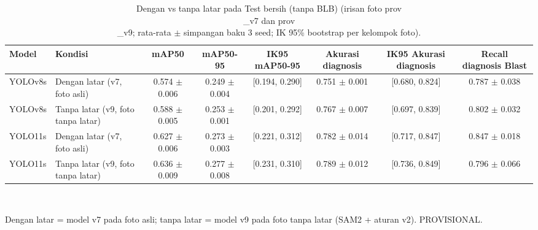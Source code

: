 \begin{table}[!t]
\centering
\caption{Dengan vs tanpa latar pada Test bersih (tanpa BLB) (irisan foto prov\\_v7 dan prov\\_v9; rata-rata $\pm$ simpangan baku 3 seed; IK 95\% bootstrap per kelompok foto).}
\label{tab:v9_2x2_test}
\footnotesize
\setlength{\tabcolsep}{3pt}
\begin{tabular}{llcccccc}
\hline
\textbf{Model} & \textbf{Kondisi} & \textbf{mAP50} & \textbf{mAP50-95} & \textbf{IK95 mAP50-95} & \textbf{Akurasi diagnosis} & \textbf{IK95 Akurasi diagnosis} & \textbf{Recall diagnosis Blast} \\
\hline
YOLOv8s & Dengan latar (v7, foto asli) & 0.574 $\pm$ 0.006 & 0.249 $\pm$ 0.004 & [0.194, 0.290] & 0.751 $\pm$ 0.001 & [0.680, 0.824] & 0.787 $\pm$ 0.038 \\
YOLOv8s & Tanpa latar (v9, foto tanpa latar) & 0.588 $\pm$ 0.005 & 0.253 $\pm$ 0.001 & [0.201, 0.292] & 0.767 $\pm$ 0.007 & [0.697, 0.839] & 0.802 $\pm$ 0.032 \\
YOLO11s & Dengan latar (v7, foto asli) & 0.627 $\pm$ 0.006 & 0.273 $\pm$ 0.003 & [0.221, 0.312] & 0.782 $\pm$ 0.014 & [0.717, 0.847] & 0.847 $\pm$ 0.018 \\
YOLO11s & Tanpa latar (v9, foto tanpa latar) & 0.636 $\pm$ 0.009 & 0.277 $\pm$ 0.008 & [0.231, 0.310] & 0.789 $\pm$ 0.012 & [0.736, 0.849] & 0.796 $\pm$ 0.066 \\
\hline
\end{tabular}
\\[2pt]\parbox{\columnwidth}{\scriptsize Dengan latar = model v7 pada foto asli; tanpa latar = model v9 pada foto tanpa latar (SAM2 + aturan v2). PROVISIONAL.}
\end{table}
